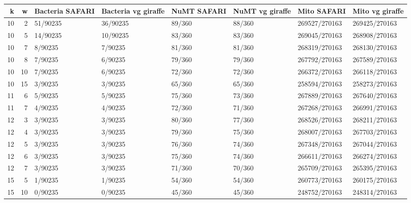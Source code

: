 \begin{tabular}{rrllllll}
\toprule
   k &    w & Bacteria SAFARI & Bacteria vg giraffe & NuMT SAFARI & NuMT vg giraffe &   Mito SAFARI & Mito vg giraffe \\
\midrule
10 &  2 &        51/90235 &            36/90235 &      89/360 &          88/360 & 269527/270163 &   269425/270163 \\
10 &  5 &        14/90235 &            10/90235 &      83/360 &          83/360 & 269045/270163 &   268908/270163 \\
10 &  7 &         8/90235 &             7/90235 &      81/360 &          81/360 & 268319/270163 &   268130/270163 \\
10 &  8 &         7/90235 &             6/90235 &      79/360 &          79/360 & 267792/270163 &   267589/270163 \\
10 & 10 &         7/90235 &             6/90235 &      72/360 &          72/360 & 266372/270163 &   266118/270163 \\
10 & 15 &         3/90235 &             3/90235 &      65/360 &          65/360 & 258594/270163 &   258273/270163 \\
11 &  6 &         5/90235 &             5/90235 &      75/360 &          73/360 & 267889/270163 &   267640/270163 \\
11 &  7 &         4/90235 &             4/90235 &      72/360 &          71/360 & 267268/270163 &   266991/270163 \\
12 &  3 &         3/90235 &             3/90235 &      80/360 &          77/360 & 268526/270163 &   268211/270163 \\
12 &  4 &         3/90235 &             3/90235 &      79/360 &          75/360 & 268007/270163 &   267703/270163 \\
12 &  5 &         3/90235 &             3/90235 &      76/360 &          74/360 & 267348/270163 &   267044/270163 \\
12 &  6 &         3/90235 &             3/90235 &      75/360 &          74/360 & 266611/270163 &   266274/270163 \\
12 &  7 &         3/90235 &             3/90235 &      71/360 &          70/360 & 265709/270163 &   265395/270163 \\
15 &  5 &         1/90235 &             1/90235 &      54/360 &          54/360 & 260773/270163 &   260175/270163 \\
15 & 10 &         0/90235 &             0/90235 &      45/360 &          45/360 & 248752/270163 &   248314/270163 \\

\end{tabular}
